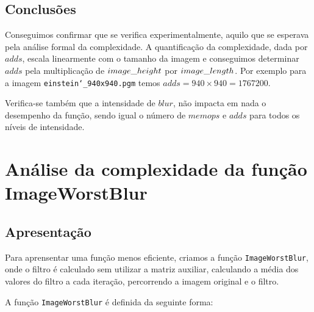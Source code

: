\documentclass{report}
\begin{document}
\newpage

\subsection{Conclusões}

Conseguimos confirmar que se verifica experimentalmente, aquilo que se esperava pela análise formal da complexidade. 
A quantificação da complexidade, dada por \(adds\), escala linearmente com o tamanho da imagem e 
conseguimos determinar \(adds\) pela multiplicação de \(image\char`_height\) por \(image\char`_length\). 
Por exemplo para a imagem \texttt{einstein\char`_940x940.pgm} temos \texttt{$adds = 940\times940 = 1767200$}.
\par
Verifica-se também que a intensidade de \(blur\), não impacta em nada o desempenho da função, sendo igual o número de \(memops\) e \(adds\) 
para todos os níveis de intensidade.


\section{Análise da complexidade da função ImageWorstBlur}

\subsection{Apresentação}
Para aprensentar uma função menos eficiente, criamos a função \texttt{ImageWorstBlur}, onde o filtro é calculado sem utilizar a matriz auxiliar,
calculando a média dos valores do filtro a cada iteração, percorrendo a imagem original e o filtro.
\par
A função \texttt{ImageWorstBlur} é definida da seguinte forma:
\end{document}
